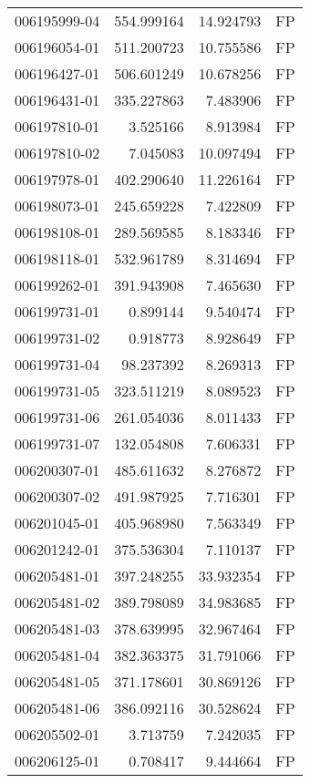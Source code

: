 \begin{tabular}{lrrl}
006195999-04 &  554.999164 &    14.924793 &   FP \\
006196054-01 &  511.200723 &    10.755586 &   FP \\
006196427-01 &  506.601249 &    10.678256 &   FP \\
006196431-01 &  335.227863 &     7.483906 &   FP \\
006197810-01 &    3.525166 &     8.913984 &   FP \\
006197810-02 &    7.045083 &    10.097494 &   FP \\
006197978-01 &  402.290640 &    11.226164 &   FP \\
006198073-01 &  245.659228 &     7.422809 &   FP \\
006198108-01 &  289.569585 &     8.183346 &   FP \\
006198118-01 &  532.961789 &     8.314694 &   FP \\
006199262-01 &  391.943908 &     7.465630 &   FP \\
006199731-01 &    0.899144 &     9.540474 &   FP \\
006199731-02 &    0.918773 &     8.928649 &   FP \\
006199731-04 &   98.237392 &     8.269313 &   FP \\
006199731-05 &  323.511219 &     8.089523 &   FP \\
006199731-06 &  261.054036 &     8.011433 &   FP \\
006199731-07 &  132.054808 &     7.606331 &   FP \\
006200307-01 &  485.611632 &     8.276872 &   FP \\
006200307-02 &  491.987925 &     7.716301 &   FP \\
006201045-01 &  405.968980 &     7.563349 &   FP \\
006201242-01 &  375.536304 &     7.110137 &   FP \\
006205481-01 &  397.248255 &    33.932354 &   FP \\
006205481-02 &  389.798089 &    34.983685 &   FP \\
006205481-03 &  378.639995 &    32.967464 &   FP \\
006205481-04 &  382.363375 &    31.791066 &   FP \\
006205481-05 &  371.178601 &    30.869126 &   FP \\
006205481-06 &  386.092116 &    30.528624 &   FP \\
006205502-01 &    3.713759 &     7.242035 &   FP \\
006206125-01 &    0.708417 &     9.444664 &   FP \\

\end{tabular}
